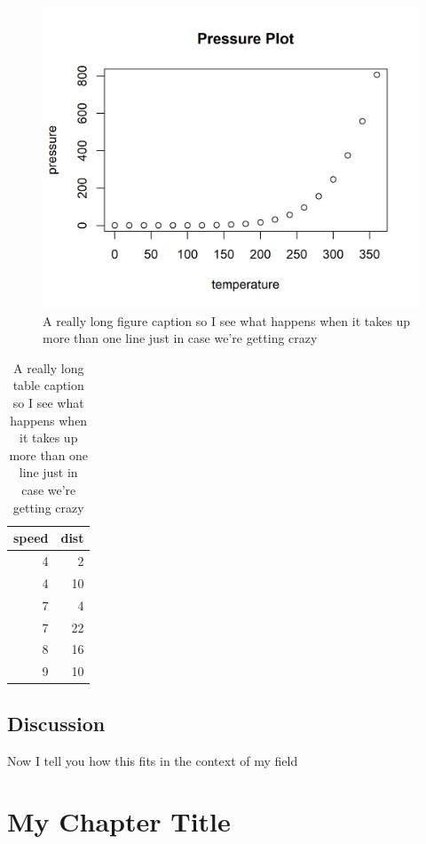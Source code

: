 \documentclass[
  10pt,
]{report}
\begin{document}
\begin{figure}
\includegraphics[width=20.83in]{Figures/pressure_plot} \caption{A really long figure caption so I see what happens when it takes up more than one line just in case we're getting crazy}\label{fig:test-fig}
\end{figure}

\begin{table}

\caption{\label{tab:testtable-2}A really long table caption so I see what happens when it takes up more than one line just in case we're getting crazy}
\centering
\begin{tabular}[t]{r|r}
\hline
speed & dist\\
\hline
4 & 2\\
\hline
4 & 10\\
\hline
7 & 4\\
\hline
7 & 22\\
\hline
8 & 16\\
\hline
9 & 10\\
\hline
\end{tabular}
\end{table}

\hypertarget{discussion}{%
\section{Discussion}\label{discussion}}

Now I tell you how this fits in the context of my field

\hypertarget{my-chapter-title}{%
\chapter{My Chapter Title}\label{my-chapter-title}}
\end{document}
